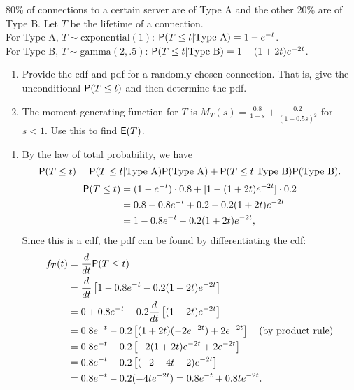 \documentclass[12pt]{article}
\newcommand{\Prob}{{\sf P}}
\newcommand{\E}{{\sf E}}
\newenvironment{problem}[2][Problem]{\begin{trivlist}
\item[\hskip \labelsep {\bfseries #1}\hskip \labelsep {\bfseries #2.}]}
{\end{trivlist}}
\begin{document}
\begin{problem}{3}
  80\% of connections to a certain server are of Type A 
  and the other 20\% are of Type B. Let
  $T$ be the lifetime of a connection.\\
  For Type A, $T \sim \text{exponential}(1)$: 
  $\Prob(T \le t| \text{Type A}) = 1 - e^{-t}$.\\
  For Type B, $T \sim \text{gamma}(2, .5)$: 
  $\Prob(T \le t| \text{Type B}) = 1 - (1 + 2t)e^{-2t}$.\\
  \begin{enumerate}
    \item Provide the cdf and pdf for a randomly chosen connection. 
    That is, give the unconditional $\Prob(T \le t)$ and then determine the pdf.
    \item The moment generating function for $T$ is 
    $M_T (s) = \frac{0.8}{1-s} + \frac{0.2}{(1-0.5s)^{2}}$ for $s < 1$.
    Use this to find $\E(T)$.
  \end{enumerate}
  \begin{enumerate}
    \item By the law of total probability, we have
    \[
      \Prob(T \le t) = \Prob(T \le t | \text{Type A}) \Prob(\text{Type A})
      + \Prob(T \le t | \text{Type B}) \Prob(\text{Type B}).
    \]
    \[
      \begin{aligned}
        \Prob(T \le t) &= (1 - e^{-t}) \cdot 0.8 + [1 - (1 + 2t)e^{-2t}] \cdot 0.2 \\
        &= 0.8 - 0.8e^{-t} + 0.2 - 0.2(1 + 2t)e^{-2t} \\
        &= 1 - 0.8e^{-t} - 0.2(1 + 2t)e^{-2t},
      \end{aligned}
    \]
    Since this is a cdf, the pdf can be found by differentiating the cdf:
    \[
      \begin{aligned}
        f_T (t) &= \frac{d}{dt} \Prob(T \le t) \\
        &= \frac{d}{dt} \left[ 1 - 0.8e^{-t} - 0.2(1 + 2t)e^{-2t} \right] \\
        &= 0 + 0.8e^{-t} - 0.2 \frac{d}{dt} \left[ (1 + 2t)e^{-2t} \right] \\
        &= 0.8e^{-t} - 0.2 \left[ (1 + 2t)(-2e^{-2t}) + 2e^{-2t} \right] 
        \quad (\text{by product rule})\\
        &= 0.8e^{-t} - 0.2 \left[ -2(1 + 2t)e^{-2t} + 2e^{-2t} \right] \\
        &= 0.8e^{-t} - 0.2 \left[ (-2 - 4t + 2)e^{-2t} \right] \\
        &= 0.8e^{-t} - 0.2(-4te^{-2t}) = 0.8e^{-t} + 0.8te^{-2t}.

\end{aligned}\]
\end{enumerate}
\end{problem}
\end{document}

